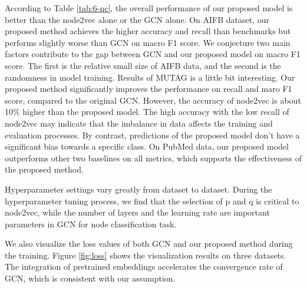 \documentclass[sigconf]{acmart}
\begin{document}
According to Table \ref{tab:6-nc}, the overall performance of our proposed model is better than the node2vec alone or the GCN alone. On AIFB dataset, our proposed method achieves the higher accuracy and recall than benchmarks but performs slightly worse than GCN on macro F1 score. We conjecture two main factors contribute to the gap between GCN and our proposed model on macro F1 score. The first is the relative small size of AIFB data, and the second is the randomness in model training. Results of MUTAG is a little bit interesting. Our proposed method significantly improves the performance on recall and maro F1 score, compared to the original GCN. However, the accuracy of node2vec is about 10\% higher than the proposed model. The high accuracy with the low recall of node2vec may indicate that the imbalance in data affects the training and evaluation processes. By contrast, predictions of the proposed model don't have a significant bias towards a specific class. On PubMed data, our proposed model outperforms other two baselines on all metrics, which supports the effectiveness of the proposed method.

Hyperparameter settings vary greatly from dataset to dataset. During the hyperparameter tuning process, we find that the selection of p and q is critical to node2vec, while the number of layers and the learning rate are important parameters in GCN for node classification task.

We also visualize the loss values of both GCN and our proposed method during the training. Figure \ref{fig:loss} shows the visualization results on three datasets. The integration of pretrained embeddings accelerates the convergence rate of GCN, which is consistent with our assumption.
\end{document}
